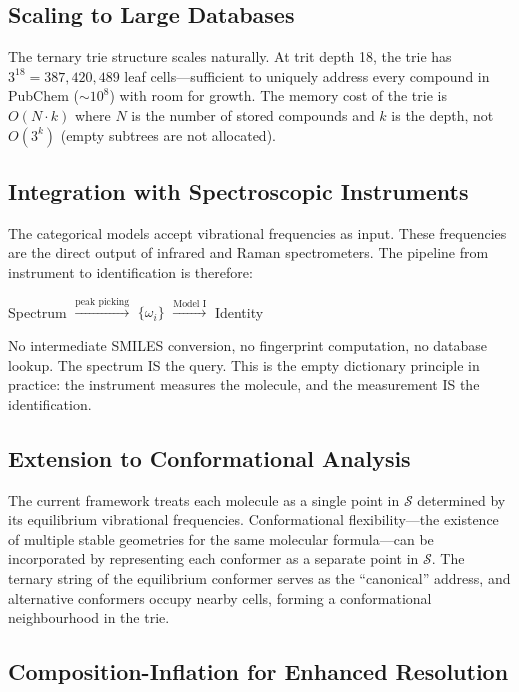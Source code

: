 \documentclass[11pt,twocolumn,a4paper]{article}
\theoremstyle{definition}
\theoremstyle{remark}
\newcommand{\Sspace}{\mathcal{S}}
\begin{document}
\subsection{Scaling to Large Databases}

The ternary trie structure scales naturally. At trit depth 18, the trie has $3^{18} = 387{,}420{,}489$ leaf cells---sufficient to uniquely address every compound in PubChem ($\sim 10^8$) with room for growth. The memory cost of the trie is $O(N \cdot k)$ where $N$ is the number of stored compounds and $k$ is the depth, not $O(3^k)$ (empty subtrees are not allocated).

\subsection{Integration with Spectroscopic Instruments}

The categorical models accept vibrational frequencies as input. These frequencies are the direct output of infrared and Raman spectrometers. The pipeline from instrument to identification is therefore:

\begin{center}
Spectrum $\xrightarrow{\text{peak picking}}$ $\{\omega_i\}$ $\xrightarrow{\text{Model I}}$ Identity
\end{center}

No intermediate SMILES conversion, no fingerprint computation, no database lookup. The spectrum IS the query. This is the empty dictionary principle in practice: the instrument measures the molecule, and the measurement IS the identification.

\subsection{Extension to Conformational Analysis}

The current framework treats each molecule as a single point in $\Sspace$ determined by its equilibrium vibrational frequencies. Conformational flexibility---the existence of multiple stable geometries for the same molecular formula---can be incorporated by representing each conformer as a separate point in $\Sspace$. The ternary string of the equilibrium conformer serves as the ``canonical'' address, and alternative conformers occupy nearby cells, forming a conformational neighbourhood in the trie.

\subsection{Composition-Inflation for Enhanced Resolution}
\end{document}
